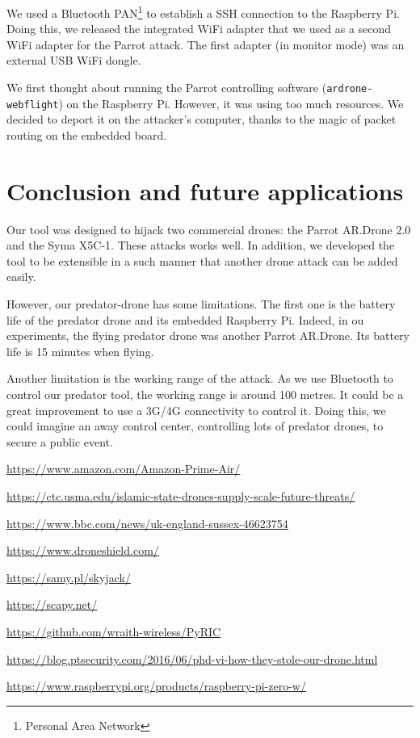 \documentclass[conference,a4paper]{IEEEtran}
\newcommand{\myv}[1]{\texttt{\small#1}}
\begin{document}
We used a Bluetooth PAN\footnote{Personal Area Network} to establish a SSH connection to
the Raspberry Pi. Doing this, we released the integrated WiFi adapter that we used as a
second WiFi adapter for the Parrot attack. The first adapter (in monitor mode) was an
external USB WiFi dongle.

We first thought about running the Parrot controlling software (\myv{ardrone-webflight})
on the Raspberry Pi. However, it was using too much resources. We decided to deport it on
the attacker's computer, thanks to the magic of packet routing on the embedded board.



\section{Conclusion and future applications}
Our tool was designed to hijack two commercial drones: the Parrot AR.Drone 2.0 and the
Syma X5C-1. These attacks works well. In addition, we developed the tool to be extensible
in a such manner that another drone attack can be added easily.

However, our predator-drone has some limitations. The first one is the battery life of the
predator drone and its embedded Raspberry Pi. Indeed, in ou experiments, the flying
predator drone was another Parrot AR.Drone. Its battery life is 15 minutes when flying.

Another limitation is the working range of the attack. As we use Bluetooth to control our
predator tool, the working range is around 100 metres. It could be a great improvement to
use a 3G/4G connectivity to control it. Doing this, we could imagine an away control
center, controlling lots of predator drones, to secure a public event.





\begin{thebibliography}{1}
    \url{https://www.amazon.com/Amazon-Prime-Air/}

    \url{https://ctc.usma.edu/islamic-state-drones-supply-scale-future-threats/}

    \url{https://www.bbc.com/news/uk-england-sussex-46623754}

    \url{https://www.droneshield.com/}

    \url{https://samy.pl/skyjack/}

    \url{https://scapy.net/}

    \url{https://github.com/wraith-wireless/PyRIC}

    \url{https://blog.ptsecurity.com/2016/06/phd-vi-how-they-stole-our-drone.html}

    \url{https://www.raspberrypi.org/products/raspberry-pi-zero-w/}

\end{thebibliography}
\end{document}
